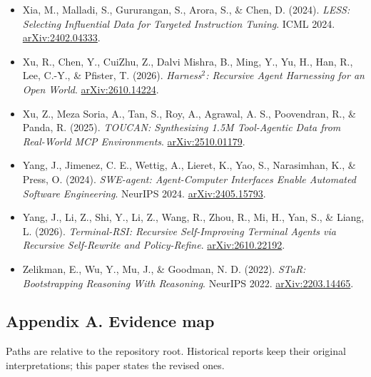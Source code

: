 \documentclass[
  10pt,
]{article}
\begin{document}
\begin{itemize}
  Xi, Z., Guo, X., Liu, J., Zhang, J., Fan, Y., Zhang, Z., Liu, S.,
  Chai, M., Shi, X., Zhai, Y., Cai, X., Gui, T., Zhang, Q., \& Huang, X.
  (2026). \emph{Can RL Improve Generalization of LLM Agents? An
  Empirical Study}.
  \href{https://arxiv.org/abs/2603.12011}{arXiv:2603.12011}.
\item
  Xia, M., Malladi, S., Gururangan, S., Arora, S., \& Chen, D. (2024).
  \emph{LESS: Selecting Influential Data for Targeted Instruction
  Tuning}. ICML 2024.
  \href{https://arxiv.org/abs/2402.04333}{arXiv:2402.04333}.
\item
  Xu, R., Chen, Y., CuiZhu, Z., Dalvi Mishra, B., Ming, Y., Yu, H., Han,
  R., Lee, C.-Y., \& Pfister, T. (2026). \emph{Harness\(^2\): Recursive
  Agent Harnessing for an Open World}.
  \href{https://arxiv.org/abs/2610.14224}{arXiv:2610.14224}.
\item
  Xu, Z., Meza Soria, A., Tan, S., Roy, A., Agrawal, A. S., Poovendran,
  R., \& Panda, R. (2025). \emph{TOUCAN: Synthesizing 1.5M Tool-Agentic
  Data from Real-World MCP Environments}.
  \href{https://arxiv.org/abs/2510.01179}{arXiv:2510.01179}.
\item
  Yang, J., Jimenez, C. E., Wettig, A., Lieret, K., Yao, S., Narasimhan,
  K., \& Press, O. (2024). \emph{SWE-agent: Agent-Computer Interfaces
  Enable Automated Software Engineering}. NeurIPS 2024.
  \href{https://arxiv.org/abs/2405.15793}{arXiv:2405.15793}.
\item
  Yang, J., Li, Z., Shi, Y., Li, Z., Wang, R., Zhou, R., Mi, H., Yan,
  S., \& Liang, L. (2026). \emph{Terminal-RSI: Recursive Self-Improving
  Terminal Agents via Recursive Self-Rewrite and Policy-Refine}.
  \href{https://arxiv.org/abs/2610.22192}{arXiv:2610.22192}.
\item
  Zelikman, E., Wu, Y., Mu, J., \& Goodman, N. D. (2022). \emph{STaR:
  Bootstrapping Reasoning With Reasoning}. NeurIPS 2022.
  \href{https://arxiv.org/abs/2203.14465}{arXiv:2203.14465}.
\end{itemize}

\normalsize

\subsection{Appendix A. Evidence map}\label{appendix-a.-evidence-map}

Paths are relative to the repository root. Historical reports keep their
original interpretations; this paper states the revised ones.
\end{document}
